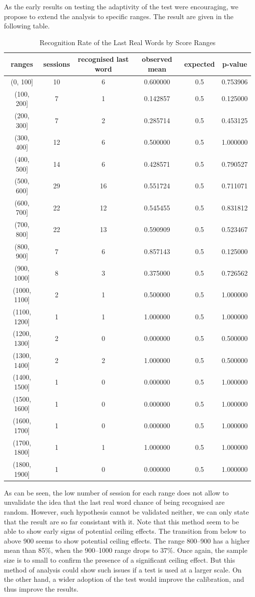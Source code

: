 As the early results on testing the adaptivity of the test were encouraging, we propose to extend the analysis to specific ranges. The result are given in the following table.

\begin{table}[h]
\centering
\begin{tabular}{|c|c|c|c|c|c|}
\hline
\textbf{ranges} & \textbf{sessions} & \textbf{recognised last word} & \textbf{observed mean} & \textbf{expected} & \textbf{p-value} \\
\hline
(0, 100] & 10 & 6 & 0.600000 & 0.5 & 0.753906 \\
(100, 200] & 7 & 1 & 0.142857 & 0.5 & 0.125000 \\
(200, 300] & 7 & 2 & 0.285714 & 0.5 & 0.453125 \\
(300, 400] & 12 & 6 & 0.500000 & 0.5 & 1.000000 \\
(400, 500] & 14 & 6 & 0.428571 & 0.5 & 0.790527 \\
(500, 600] & 29 & 16 & 0.551724 & 0.5 & 0.711071 \\
(600, 700] & 22 & 12 & 0.545455 & 0.5 & 0.831812 \\
(700, 800] & 22 & 13 & 0.590909 & 0.5 & 0.523467 \\
(800, 900] & 7 & 6 & 0.857143 & 0.5 & 0.125000 \\
(900, 1000] & 8 & 3 & 0.375000 & 0.5 & 0.726562 \\
(1000, 1100] & 2 & 1 & 0.500000 & 0.5 & 1.000000 \\
(1100, 1200] & 1 & 1 & 1.000000 & 0.5 & 1.000000 \\
(1200, 1300] & 2 & 0 & 0.000000 & 0.5 & 0.500000 \\
(1300, 1400] & 2 & 2 & 1.000000 & 0.5 & 0.500000 \\
(1400, 1500] & 1 & 0 & 0.000000 & 0.5 & 1.000000 \\
(1500, 1600] & 1 & 0 & 0.000000 & 0.5 & 1.000000 \\
(1600, 1700] & 1 & 0 & 0.000000 & 0.5 & 1.000000 \\
(1700, 1800] & 1 & 1 & 1.000000 & 0.5 & 1.000000 \\
(1800, 1900] & 1 & 0 & 0.000000 & 0.5 & 1.000000 \\
\hline
\end{tabular}
\caption{Recognition Rate of the Last Real Words by Score Ranges}
\label{tab:recognition_stats}
\end{table}

As can be seen, the low number of session for each range does not allow to unvalidate the idea that the last real word chance of being recognised are random. However, such hypothesis cannot be validated neither, we can only state that the result are so far consistant with it. Note that this method seem to be able to show early signs of potential ceiling effects. The transition from below to above 900 seems to show potential ceiling effects. The range 800–900 has a higher mean than 85\%, when the 900–1000 range drops to 37\%. Once again, the sample size is to small to confirm the presence of a significant ceiling effect. But this method of analysis could show such issues if a test is used at a larger scale. On the other hand, a wider adoption of the test would improve the calibration, and thus improve the results.